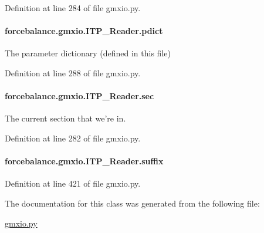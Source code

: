 Definition at line 284 of file gmxio.\-py.

\hypertarget{classforcebalance_1_1gmxio_1_1ITP__Reader_a1c74f6a71b392ecbf20ccc1e12b0d321}{
\paragraph[{pdict}]{\setlength{\rightskip}{0pt plus 5cm}forcebalance.\-gmxio.\-I\-T\-P\-\_\-\-Reader.\-pdict}}\label{classforcebalance_1_1gmxio_1_1ITP__Reader_a1c74f6a71b392ecbf20ccc1e12b0d321}


The parameter dictionary (defined in this file) 



Definition at line 288 of file gmxio.\-py.

\hypertarget{classforcebalance_1_1gmxio_1_1ITP__Reader_a744b1698c9ccfc1be470d83862099551}{
\paragraph[{sec}]{\setlength{\rightskip}{0pt plus 5cm}forcebalance.\-gmxio.\-I\-T\-P\-\_\-\-Reader.\-sec}}\label{classforcebalance_1_1gmxio_1_1ITP__Reader_a744b1698c9ccfc1be470d83862099551}


The current section that we're in. 



Definition at line 282 of file gmxio.\-py.

\hypertarget{classforcebalance_1_1gmxio_1_1ITP__Reader_a147438dd2683af88b92b659c96162848}{
\paragraph[{suffix}]{\setlength{\rightskip}{0pt plus 5cm}forcebalance.\-gmxio.\-I\-T\-P\-\_\-\-Reader.\-suffix}}\label{classforcebalance_1_1gmxio_1_1ITP__Reader_a147438dd2683af88b92b659c96162848}


Definition at line 421 of file gmxio.\-py.



The documentation for this class was generated from the following file\-:\begin{DoxyCompactItemize}
\item 
\hyperlink{gmxio_8py}{gmxio.\-py}\end{DoxyCompactItemize}

